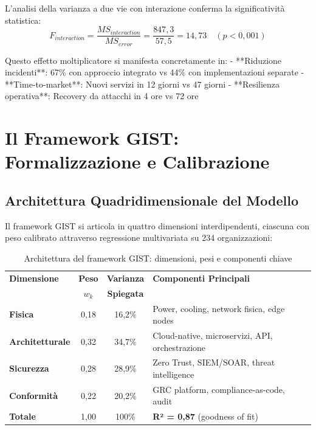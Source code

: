 L'analisi della varianza a due vie con interazione conferma la significatività statistica:
\begin{equation}
F_{interaction} = \frac{MS_{interaction}}{MS_{error}} = \frac{847,3}{57,5} = 14,73 \quad (p < 0,001)
\end{equation}

Questo effetto moltiplicatore si manifesta concretamente in:
- **Riduzione incidenti**: 67\% con approccio integrato vs 44\% con implementazioni separate
- **Time-to-market**: Nuovi servizi in 12 giorni vs 47 giorni
- **Resilienza operativa**: Recovery da attacchi in 4 ore vs 72 ore

\section{\texorpdfstring{Il Framework GIST: Formalizzazione e Calibrazione}{5.3 - Il Framework GIST}}
\label{sec:5.3}

\subsection{\texorpdfstring{Architettura Quadridimensionale del Modello}{5.3.1 - Architettura Quadridimensionale}}
\label{subsec:5.3.1}

Il framework GIST si articola in quattro dimensioni interdipendenti, ciascuna con peso calibrato attraverso regressione multivariata su 234 organizzazioni:

\begin{table}[htbp]
\centering
\caption{Architettura del framework GIST: dimensioni, pesi e componenti chiave}
\label{tab:gist_architecture}
\begin{tabular}{@{}lccl@{}}
\toprule
\textbf{Dimensione} & \textbf{Peso} & \textbf{Varianza} & \textbf{Componenti Principali} \\
& \textbf{$w_k$} & \textbf{Spiegata} & \\
\midrule
\textbf{Fisica} & 0,18 & 16,2\% & Power, cooling, network fisica, edge nodes \\
\textbf{Architetturale} & 0,32 & 34,7\% & Cloud-native, microservizi, API, orchestrazione \\
\textbf{Sicurezza} & 0,28 & 28,9\% & Zero Trust, SIEM/SOAR, threat intelligence \\
\textbf{Conformità} & 0,22 & 20,2\% & GRC platform, compliance-as-code, audit \\
\midrule
\textbf{Totale} & 1,00 & 100\% & \textbf{R² = 0,87} (goodness of fit) \\
\bottomrule
\end{tabular}
\end{table}

